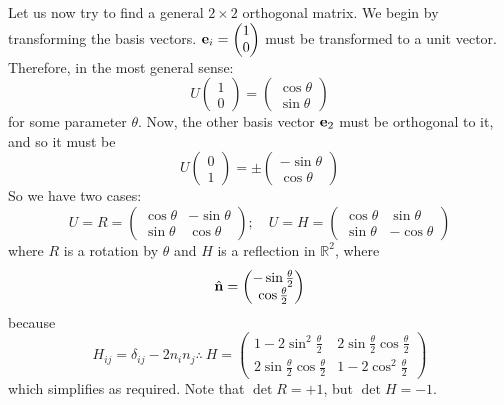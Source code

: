 Let us now try to find a general \(2 \times 2\) orthogonal matrix.
We begin by transforming the basis vectors.
\(\vb e_i = \begin{pmatrix} 1 \\ 0 \end{pmatrix}\) must be transformed to a unit vector.
Therefore, in the most general sense:
\[
	U \begin{pmatrix}
		1 \\ 0
	\end{pmatrix} = \begin{pmatrix}
		\cos \theta \\ \sin \theta
	\end{pmatrix}
\]
for some parameter \(\theta\).
Now, the other basis vector \(\vb e_2\) must be orthogonal to it, and so it must be
\[
	U \begin{pmatrix}
		0 \\ 1
	\end{pmatrix} = \pm\begin{pmatrix}
		-\sin \theta \\
		\cos \theta
	\end{pmatrix}
\]
So we have two cases:
\[
	U = R = \begin{pmatrix}
		\cos \theta & -\sin\theta \\ \sin \theta & \cos \theta
	\end{pmatrix};\quad U = H = \begin{pmatrix}
		\cos \theta & \sin \theta \\ \sin \theta & -\cos \theta
	\end{pmatrix}
\]
where \(R\) is a rotation by \(\theta\) and \(H\) is a reflection in \(\mathbb R^2\), where
\[
	\hat{\vb{n}} = \begin{pmatrix}
		-\sin \frac{\theta}{2} \\ \cos \frac{\theta}{2}
	\end{pmatrix}
\]
because
\[
	H_{ij} = \delta_{ij} - 2n_i n_j \therefore\ H = \begin{pmatrix}
		1 - 2 \sin^2 \frac{\theta}{2}              & 2\sin\frac{\theta}{2}\cos\frac{\theta}{2} \\
		2\sin\frac{\theta}{2} \cos\frac{\theta}{2} & 1-2\cos^2\frac{\theta}{2}
	\end{pmatrix}
\]
which simplifies as required.
Note that \(\det R = +1\), but \(\det H = -1\).

